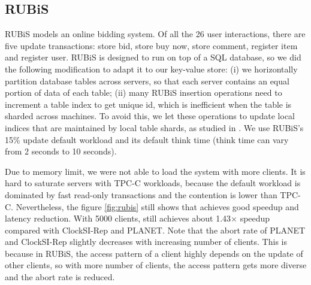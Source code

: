 \subsection{RUBiS}
RUBiS \cite{rubis} models an online bidding system. Of all the 26 user interactions, there are five update transactions: store bid, store buy now, store comment, register item and register user. RUBiS is designed to run on top of a SQL database, so we did the following modification to adapt it to our key-value store: (i) we horizontally partition database tables across servers, so that each server contains an equal portion of data of each table; (ii) many RUBiS insertion operations need to increment a table index to get unique id, which is inefficient when the table is sharded across machines. To avoid this, we let these operations to update local indices that are maintained by local table shards, as studied in \cite{cecchet2008middleware}. We use RUBiS's 15\% update default workload and its default think time (think time can vary from 2 seconds to 10 seconds).

Due to memory limit, we were not able to load the system with more clients. It is hard to saturate servers with TPC-C workloads, because the default workload is dominated by fast read-only transactions and the contention is lower than TPC-C. Nevertheless, the figure \ref{fig:rubis} still shows that \specula achieves good speedup and latency reduction. With 5000 clients, \specula still achieves about 1.43$\times$ speedup compared with ClockSI-Rep and PLANET. Note that the abort rate of PLANET and ClockSI-Rep slightly decreases with increasing number of clients. This is because in RUBiS, the access pattern of a client highly depends on the update of other clients, so with more number of clients, the access pattern gets more diverse and the abort rate is reduced.

